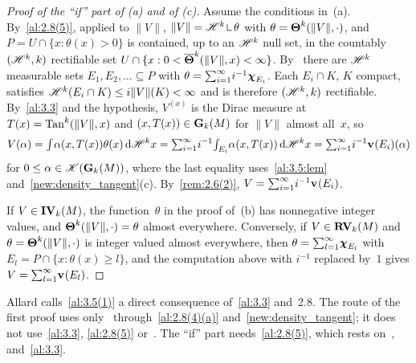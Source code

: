 \begin{proof}[Proof of the ``if'' part of (a) and of (c)]
    Assume the conditions in~(a). By~\ref{al:2.8(5)}, applied to $\|V\|$, $\|V\| = \HM^{\vdim}
    \restrict \theta$ with $\theta = \boldsymbol{\Theta}^{k}(\|V\|,\cdot)$, and $P = U \cap \{ x :
    \theta(x) > 0 \}$ is contained, up to an $\mathscr{H}^{k}$ null set, in the countably
    $(\mathscr{H}^{k},k)$ rectifiable set $U \cap \{ x : 0 < \boldsymbol{\overline{\Theta}}^{k}(\|V\|,x) < \infty
    \}$. By~\cite[2.3.3]{Federer1969} there are $\mathscr{H}^{k}$ measurable sets $E_1, E_2, \ldots
    \subseteq P$ with $\theta = {\textstyle\sum_{i=1}^{\infty}} i^{-1} \boldsymbol{\chi}_{E_i}$. Each $E_i \cap K$, $K$
    compact, satisfies $\mathscr{H}^{k}(E_i \cap K) \le i \|V\|(K) < \infty$ and is therefore
    $(\mathscr{H}^{k},k)$ rectifiable. By~\ref{al:3.3} and the hypothesis, $V^{(x)}$ is the Dirac
    measure at $T(x) = \operatorname{Tan}^{k}(\|V\|,x)$ and $(x, T(x)) \in \mathbf{G}_{k}(M)$ for $\|V\|$ almost
    all~$x$, so
    \begin{displaymath}
        V(\alpha) = {\textstyle\int_{}^{}} \alpha(x,T(x)) \theta(x) \,\mathrm{d} \mathscr{H}^{k} x = {\textstyle\sum_{i=1}^{\infty}}
        i^{-1} {\textstyle\int_{E_i}^{}} \alpha(x,T(x)) \,\mathrm{d} \mathscr{H}^{k} x = {\textstyle\sum_{i=1}^{\infty}} i^{-1}
        \mathbf{v}_{}(E_i)(\alpha)
    \end{displaymath}
    for $0 \le \alpha \in \mathscr{K}(\mathbf{G}_{k}(M))$, where the last equality uses~\ref{al:3.5:lem}
    and~\ref{new:density_tangent}(c). By~\ref{rem:2.6(2)}, $V = {\textstyle\sum_{i=1}^{\infty}} i^{-1}
    \mathbf{v}_{}(E_i)$.

    If $V \in \mathbf{IV}_{k}(M)$, the function~$\theta$ in the proof of~(b) has nonnegative
    integer values, and $\boldsymbol{\Theta}^{k}(\|V\|,\cdot) = \theta$ almost everywhere. Conversely, if
    $V \in \mathbf{RV}_{k}(M)$ and $\theta = \boldsymbol{\Theta}^{k}(\|V\|,\cdot)$ is integer valued almost
    everywhere, then $\theta = {\textstyle\sum_{l=1}^{\infty}} \boldsymbol{\chi}_{E_l}$ with $E_l = P \cap \{ x : \theta(x)
    \ge l \}$, and the computation above with $i^{-1}$ replaced by~$1$ gives $V =
    {\textstyle\sum_{l=1}^{\infty}} \mathbf{v}_{}(E_l)$.
\end{proof}

\begin{remark}
    \label{rem:3.5(1)}
    Allard calls~\ref{al:3.5(1)} a direct consequence of~\ref{al:3.3} and~2.8. The route of the
    first proof uses only~\cite[2.8.18, 2.9.9, 2.10.19(4), 3.2.19, 3.2.25]{Federer1969}
    through~\ref{al:2.8(4)(a)} and~\ref{new:density_tangent}; it does not use~\ref{al:3.3},
    \ref{al:2.8(5)} or~\cite[3.3.17]{Federer1969}. The ``if'' part needs~\ref{al:2.8(5)}, which
    rests on~\cite[3.3.17]{Federer1969}, and~\ref{al:3.3}.
\end{remark}

